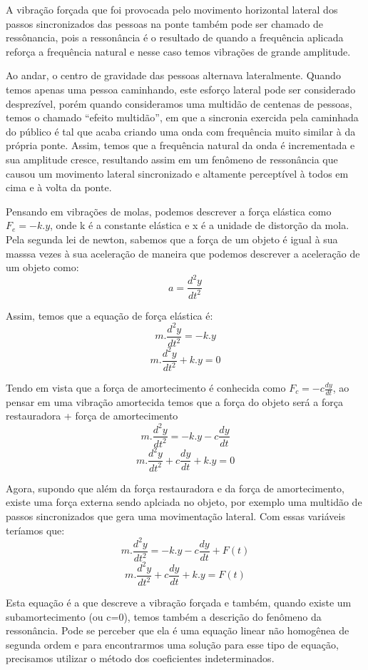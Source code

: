 \documentclass[]{article}
\begin{document}
A vibração forçada que foi provocada pelo movimento horizontal lateral dos passos sincronizados das pessoas na ponte também pode ser 
chamado de ressônancia, pois a ressonância  é o resultado de quando a frequência aplicada reforça a frequência natural e nesse caso temos vibrações de grande amplitude.

Ao andar, o centro de gravidade das pessoas alternava lateralmente. 
Quando temos apenas uma pessoa caminhando, este esforço lateral pode ser considerado 
desprezível, porém quando consideramos uma multidão de centenas de pessoas, temos o 
chamado “efeito multidão”, em que a sincronia exercida pela caminhada do público é tal 
que acaba criando uma onda com frequência muito similar à da própria ponte. Assim, 
temos que a frequência natural da onda é incrementada e sua amplitude cresce, 
resultando assim em um fenômeno de ressonância que causou um movimento lateral 
sincronizado e altamente perceptível à todos em cima e à volta da ponte.

Pensando em vibrações de molas, podemos descrever a força elástica como $F_e = -k.y$, onde k é a
constante elástica e x é a unidade de distorção da mola. Pela segunda lei de newton, sabemos que a força de um
objeto é igual à sua masssa vezes à sua aceleração de maneira que podemos descrever a aceleração de um objeto como:
\[ a = \frac{d^2 y}{d t^2} \]

Assim, temos que a equação de força elástica é:
\[ m.\frac{d^2 y}{d t^2} = -k.y \]
\[ m.\frac{d^2 y}{d t^2} + k.y = 0\]

Tendo em vista que a força de amortecimento é conhecida como $F_c = -c\frac{dy}{dt}$,
ao pensar em uma vibração amortecida temos que a força do objeto será a 
força restauradora + força de amortecimento
\[ m.\frac{d^2 y}{d t^2} = -k.y - c\frac{dy}{dt}\]
\[ m.\frac{d^2 y}{d t^2} + c\frac{dy}{dt}  + k.y = 0\]

Agora, supondo que além da força restauradora e da força de amortecimento, existe uma força externa sendo aplciada no
objeto, por exemplo uma multidão de passos sincronizados que gera uma movimentação lateral.
Com essas variáveis teríamos que:
\[ m.\frac{d^2 y}{d t^2} = -k.y - c\frac{dy}{dt} + F(t)\] 
\[ m.\frac{d^2 y}{d t^2} + c\frac{dy}{dt}  + k.y = F(t)\] 

Esta equação é a que descreve a vibração forçada e também, quando existe um subamortecimento (ou c=0),
temos também a descrição do fenômeno da ressonância.
Pode se perceber que ela é uma equação linear não homogênea de segunda ordem e para encontrarmos 
uma solução para esse tipo de equação, precisamos utilizar o método dos coeficientes indeterminados.
\end{document}
